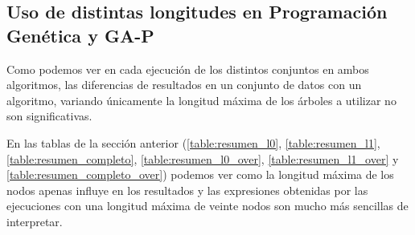 \begin{table}[H]
\centering
{}

\caption{Resumen de los resultados obtenidos de media en el conjunto de datos completo con sobremuestreo.}\label{table:resumen_completo_over}
\end{table}



\subsection{Uso de distintas longitudes en Programación Genética y GA-P}

Como podemos ver en cada ejecución de los distintos conjuntos en ambos algoritmos, las diferencias de resultados en un conjunto de datos con un algoritmo, variando únicamente la longitud máxima de los árboles a utilizar no son significativas.

En las tablas de la sección anterior (\ref{table:resumen_l0}, \ref{table:resumen_l1}, \ref{table:resumen_completo}, \ref{table:resumen_l0_over}, \ref{table:resumen_l1_over} y \ref{table:resumen_completo_over}) podemos ver como la longitud máxima de los nodos apenas influye en los resultados y las expresiones obtenidas por las ejecuciones con una longitud máxima de veinte nodos son mucho más sencillas de interpretar.

